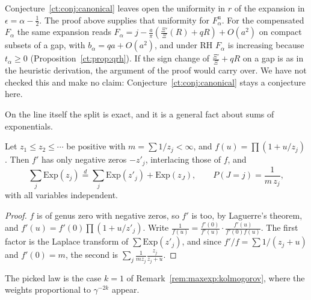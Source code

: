 \begin{remark}\label{lg:rem:canonical}
Conjecture~\ref{ct:conj:canonical} leaves open the uniformity in $r$ of the expansion in $\epsilon=\alpha-\frac12$. The proof above supplies that uniformity for $F^{\mathrm u}_\alpha$. For the compensated $F_\alpha$ the same expansion reads $F_\alpha=j-\frac a\pi(\frac{\Xi'}\Xi(R)+qR)+O(a^2)$ on compact subsets of a gap, with $b_\alpha=qa+O(a^2)$, and under RH $F_\alpha$ is increasing because $t_\alpha\ge0$ (Proposition~\ref{ct:prop:qrh}). If the sign change of $\frac{\Xi'}\Xi+qR$ on a gap is as in the heuristic derivation, the argument of the proof would carry over. We have not checked this and make no claim: Conjecture~\ref{ct:conj:canonical} stays a conjecture here.
\end{remark}
On the line itself the split is exact, and it is a general fact about sums of exponentials.
\begin{lemma}\label{lg:lem:pick}
Let $z_1\le z_2\le\cdots$ be positive with $m=\sum1/z_j<\infty$, and $f(u)=\prod(1+u/z_j)$. Then $f'$ has only negative zeros $-z'_j$, interlacing those of $f$, and
\[
\sum_j\mathrm{Exp}(z_j)\overset d=\sum_j\mathrm{Exp}(z'_j)+\mathrm{Exp}(z_J),\qquad P(J=j)=\frac1{m\,z_j},
\]
with all variables independent.
\end{lemma}
\begin{proof}
$f$ is of genus zero with negative zeros, so $f'$ is too, by Laguerre's theorem, and $f'(u)=f'(0)\prod(1+u/z'_j)$. Write $\frac1{f(u)}=\frac{f'(0)}{f'(u)}\cdot\frac{f'(u)}{f'(0)f(u)}$. The first factor is the Laplace transform of $\sum\mathrm{Exp}(z'_j)$, and since $f'/f=\sum1/(z_j+u)$ and $f'(0)=m$, the second is $\sum_j\frac1{mz_j}\frac{z_j}{z_j+u}$.
\end{proof}
The picked law is the case $k=1$ of Remark~\ref{rem:maxexp:kolmogorov}, where the weights proportional to $\gamma^{-2k}$ appear.
